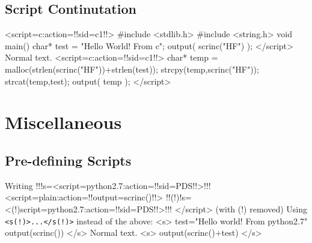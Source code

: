 \documentclass[a4paper,12pt,twocolum]{article}
\begin{document}
\subsection{Script Continutation}
<script=c:action={!!sid=c1!!}>
#include <stdlib.h>
#include <string.h>
void main(){
char* test = "Hello World! From c";
output( scrinc("HF") );
</script>
Normal text.
<script=c:action={!!sid=c1!!}>
char* temp = malloc(strlen(scrinc("HF"))+strlen(test));
strcpy(temp,scrinc("HF"));
strcat(temp,test);
output( temp );
}
</script>
\section{Miscellaneous}
\subsection{Pre-defining Scripts}
Writing
!!!s={<script=python2.7:action={!!sid=PDS!!}>}!!!
<script=plain:action={!!output=scrinc()!!}>
!!(!)!s={<(!)script=python2.7:action={!!sid=PDS!!}>}!!!
</script>
(with (!) removed) Using \lstinline{<s(!)>...</s(!)>} instead of the above:
<s>
test="Hello world! From python2.7"
output(scrinc())
</s>
Normal text.
<s>
output(scrinc()+test)
</s>
\end{document}
